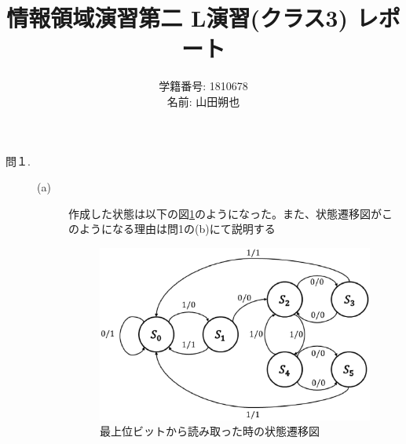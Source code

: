 \documentclass{jsarticle}
\title{情報領域演習第二 L演習(クラス3) レポート}
\author{学籍番号: 1810678 \\
        名前: 山田朔也}
\begin{document}
    \maketitle
    \begin{description}
        \item[問１.]
        \begin{description}
            \item[(a)]
            作成した状態は以下の図\ref{fig1}のようになった。また、状態遷移図がこのようになる理由は問1の(b)にて説明する
            \begin{figure}[H]
                \centering
                \includegraphics[width = 10cm]{fig_1.eps}
                \caption{最上位ビットから読み取った時の状態遷移図}
                \label{fig1}
            \end{figure}


\end{description}
\end{description}
\end{document}
